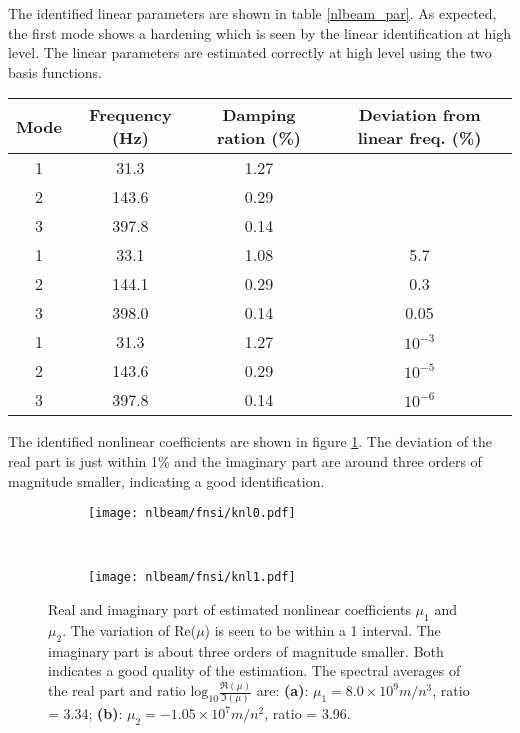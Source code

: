 The identified linear parameters are shown in table \ref{nlbeam_par}. As
expected, the first mode shows a hardening which is seen by the linear
identification at high level. The linear parameters are estimated correctly at
high level using the two basis functions.

\begin{center}
  \begin{tabular}{*{4}{c}}
    \hline
    Mode & Frequency (Hz) & Damping ration (\%) & Deviation from linear freq. (\%) \\
    \hline
    1 & 31.3 & 1.27 \\
    2 & 143.6 & 0.29 \\
    3 & 397.8 & 0.14 \\
    \hline
    1 & 33.1 & 1.08 & 5.7 \\
    2 & 144.1 & 0.29 & 0.3 \\
    3 & 398.0 & 0.14 & 0.05 \\
    \hline
    1 & 31.3 & 1.27 & $10^{-3}$ \\
    2 & 143.6 & 0.29 & $10^{-5}$ \\
    3 & 397.8 & 0.14 & $10^{-6}$ \\
    \hline
  \end{tabular}
  \label{tab:nlbeam_par}
\end{center}

The identified nonlinear coefficients are shown in figure \ref{fig:nlbeam_knl}.
The deviation of the real part is just within 1\% and the imaginary part are
around three orders of magnitude smaller, indicating a good identification.

\begin{figure}[!ht]
  \centering
  \begin{subfigure}[b]{0.45\textwidth}
    \texttt{[image: nlbeam/fnsi/knl0.pdf]}
    \caption{}
  \end{subfigure}
  ~
  \begin{subfigure}[b]{0.45\textwidth}
    \texttt{[image: nlbeam/fnsi/knl1.pdf]}
    \caption{}
  \end{subfigure}
  \caption{Real and imaginary part of estimated nonlinear coefficients $\mu_1$
    and $\mu_2$. The variation of Re($\mu$) is seen to be within a 1 interval.
    The imaginary part is about three orders of magnitude smaller. Both
    indicates a good quality of the estimation. The spectral averages of the
    real part and ratio $\text{log}_{10}\frac{\Re(\mu)}{\Im(\mu)}$ are:
    \textbf{(a)}: $\mu_1 = 8.0 \times 10^9 m/n^3$, ratio = 3.34;
    \textbf{(b)}: $\mu_2 = -1.05 \times 10^7 m/n^2$, ratio = 3.96.
  }
  \label{fig:nlbeam_knl}
\end{figure}


